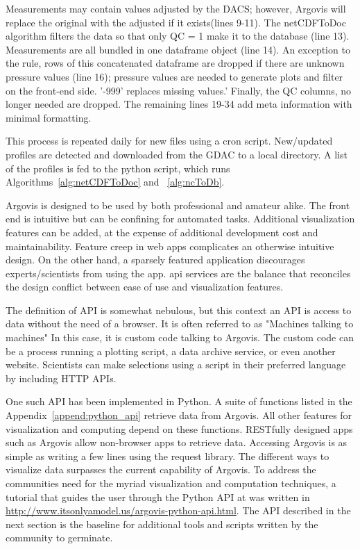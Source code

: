 Measurements may contain values adjusted by the DACS; however, Argovis will replace the original with the adjusted if it exists(lines 9-11). The netCDFToDoc algorithm filters the data so that only QC = 1 make it to the database (line 13). Measurements are all bundled in one \gls{dataframe} object (line 14). An exception to the rule, rows of this concatenated dataframe are dropped if there are unknown pressure values (line 16); pressure values are needed to generate plots and filter on the front-end side. '-999' replaces missing values.' Finally, the QC columns, no longer needed are dropped. The remaining lines 19-34 add meta information with minimal formatting.

This process is repeated daily for new files using a \gls{cron} script. New/updated profiles are detected and downloaded from the GDAC to a local directory. A list of the profiles is fed to the python script, which runs Algorithms~\ref{alg:netCDFToDoc} and ~\ref{alg:ncToDb}.

Argovis is designed to be used by both professional and amateur alike. The front end is intuitive but can be confining for automated tasks. Additional visualization features can be added, at the expense of additional development cost and maintainability. Feature creep in web apps complicates an otherwise intuitive design. On the other hand, a sparsely featured application discourages experts/scientists from using the app. \gls{api} services are the balance that reconciles the design conflict between ease of use and visualization features.

The definition of API is somewhat nebulous, but this context an API is access to data without the need of a browser. It is often referred to as "Machines talking to machines" In this case, it is custom code talking to Argovis. The custom code can be a process running a plotting script, a data archive service, or even another website. Scientists can make selections using a script in their preferred language by including HTTP APIs.

One such API has been implemented in Python. A suite of functions listed in the Appendix~\ref{append:python_api} retrieve data from Argovis. All other features for visualization and computing depend on these functions. RESTfully designed apps such as Argovis allow non-browser apps to retrieve data. Accessing Argovis is as simple as writing a few lines using the request library. The different ways to visualize data surpasses the current capability of Argovis. To address the communities need for the myriad visualization and computation techniques, a tutorial that guides the user through the Python API at was written in \url{http://www.itsonlyamodel.us/argovis-python-api.html}. The API described in the next section is the baseline for additional tools and scripts written by the community to germinate.

